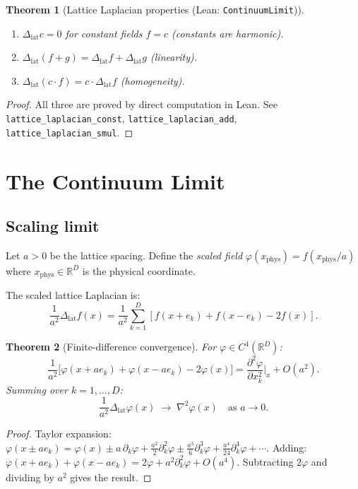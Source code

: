 \documentclass[11pt,a4paper]{article}
\theoremstyle{plain}
\newtheorem{theorem}{Theorem}[section]
\theoremstyle{definition}
\theoremstyle{remark}
\newcommand{\R}{\mathbb{R}}
\newcommand{\Lap}{\Delta_{\mathrm{lat}}}
\begin{document}
\begin{theorem}[Lattice Laplacian properties {\normalfont (Lean: \texttt{ContinuumLimit})}]
\label{thm:lap-props}
\begin{enumerate}[nosep,label=(\alph*)]
\item $\Lap c = 0$ for constant fields $f = c$ \;(constants are harmonic).
\item $\Lap(f + g) = \Lap f + \Lap g$ \;(linearity).
\item $\Lap(c \cdot f) = c \cdot \Lap f$ \;(homogeneity).
\end{enumerate}
\end{theorem}

\begin{proof}
All three are proved by direct computation in Lean.  See
\texttt{lattice\_laplacian\_const}, \texttt{lattice\_laplacian\_add},
\texttt{lattice\_laplacian\_smul}.
\end{proof}

\section{The Continuum Limit}
\label{sec:continuum}

\subsection{Scaling limit}

Let $a > 0$ be the lattice spacing.  Define the \emph{scaled field}
$\varphi(x_{\text{phys}}) = f(x_{\text{phys}} / a)$ where
$x_{\text{phys}} \in \R^D$ is the physical coordinate.

The scaled lattice Laplacian is:
\[
  \frac{1}{a^2}\Lap f(x)
  = \frac{1}{a^2}\sum_{k=1}^D [f(x+e_k) + f(x-e_k) - 2f(x)].
\]

\begin{theorem}[Finite-difference convergence]
\label{thm:fd-convergence}
For $\varphi \in C^4(\R^D)$:
\[
  \frac{1}{a^2}\bigl[\varphi(x + ae_k) + \varphi(x - ae_k) - 2\varphi(x)\bigr]
  = \frac{\partial^2 \varphi}{\partial x_k^2}\bigg|_x + O(a^2).
\]
Summing over $k = 1, \ldots, D$:
\[
  \frac{1}{a^2}\Lap \varphi(x) \;\to\; \nabla^2 \varphi(x)
  \quad\text{as } a \to 0.
\]
\end{theorem}

\begin{proof}
Taylor expansion: $\varphi(x \pm ae_k) = \varphi(x) \pm a\,\partial_k\varphi
+ \frac{a^2}{2}\partial_k^2\varphi \pm \frac{a^3}{6}\partial_k^3\varphi
+ \frac{a^4}{24}\partial_k^4\varphi + \cdots$.  Adding:
$\varphi(x+ae_k) + \varphi(x-ae_k) = 2\varphi + a^2\partial_k^2\varphi
+ O(a^4)$.  Subtracting $2\varphi$ and dividing by $a^2$ gives the result.
\end{proof}
\end{document}
